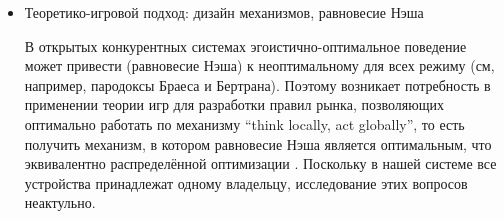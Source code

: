 \documentclass{report}
\begin{document}
\begin{itemize}
\item Теоретико-игровой подход: дизайн механизмов, равновесие Нэша

В открытых конкурентных системах эгоистично-оптимальное поведение может привести (равновесие Нэша) к неоптимальному для всех режиму (см, например, пародоксы Браеса и Бертрана).
Поэтому возникает потребность в применении теории игр для разработки правил рынка, позволяющих оптимально работать по механизму ``think locally, act globally'', то есть получить механизм, в котором равновесие Нэша является оптимальным, что эквивалентно распределённой оптимизации \cite{li2013designing}.
Поскольку в нашей системе все устройства принадлежат одному владельцу, исследование этих вопросов неактульно.



    
    
    
    
        

\end{itemize}
\end{document}
